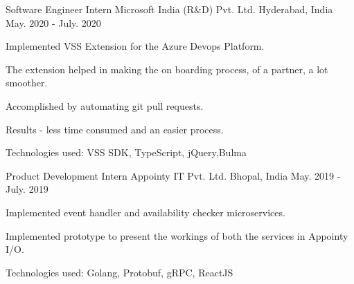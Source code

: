 

\begin{cventries}

  \cventry
    {Software Engineer Intern} %
    {Microsoft India (R\&D) Pvt. Ltd.} %
    {Hyderabad, India} %
    {May. 2020 - July. 2020} %
    {
      \begin{cvitems} %
        \item {Implemented VSS Extension for the Azure Devops Platform. }
        \item {The extension helped in making the on boarding process, of a partner, a lot smoother.}
        \item {Accomplished by automating git pull requests.}
        \item {Results - less time consumed and an easier process.}
        \item {Technologies used: VSS SDK, TypeScript, jQuery,Bulma}
      \end{cvitems}
    }

  \cventry
    {Product Development Intern} %
    {Appointy IT Pvt. Ltd.} %
    {Bhopal, India} %
    {May. 2019 - July. 2019} %
    {
      \begin{cvitems} %
        \item {Implemented event handler and availability checker microservices.}
        \item {Implemented prototype to present the workings of both the services in Appointy I/O.}
        \item {Technologies used: Golang, Protobuf, gRPC, ReactJS}
      \end{cvitems}
    }

\end{cventries}

